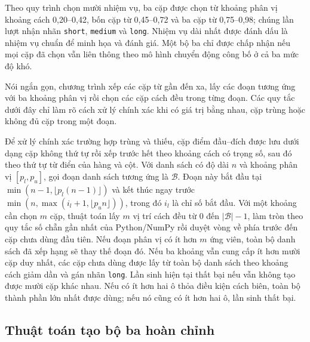 \documentclass[11pt]{article}
\begin{document}
Theo quy trình chọn mười nhiệm vụ, ba cặp được chọn từ khoảng phân vị khoảng cách
0,20--0,42, bốn cặp từ 0,45--0,72 và ba cặp từ 0,75--0,98; chúng lần lượt nhận
nhãn \texttt{short}, \texttt{medium} và \texttt{long}. Nhiệm vụ dài nhất được
đánh dấu là nhiệm vụ chuẩn để minh họa và đánh giá. Một bộ ba chỉ được chấp nhận
nếu mọi cặp đã chọn vẫn liên thông theo mô hình chuyển động công bố ở cả ba mức
độ khó.

Nói ngắn gọn, chương trình xếp các cặp từ gần đến xa, lấy các đoạn tương ứng
với ba khoảng phân vị rồi chọn các cặp cách đều trong từng đoạn. Các quy tắc
dưới đây chỉ làm rõ cách xử lý chính xác khi có giá trị bằng nhau, cặp trùng
hoặc không đủ cặp trong một đoạn.

Để xử lý chính xác trường hợp trùng và thiếu, cặp điểm đầu--đích được lưu dưới dạng
cặp không thứ tự rồi xếp trước hết theo khoảng cách có trọng số, sau đó theo thứ
tự từ điển của hàng và cột. Với danh sách có độ dài $n$ và khoảng phân vị
$[p_l,p_u]$, gọi đoạn danh sách tương ứng là $\mathcal{B}$. Đoạn này bắt đầu tại
$\min(n-1,\lfloor p_l(n-1)\rfloor)$ và kết thúc
ngay trước $\min(n,\max(i_l+1,\lfloor p_u n\rfloor))$, trong đó $i_l$ là chỉ
số bắt đầu. Với một khoảng cần chọn $m$ cặp, thuật toán lấy $m$ vị trí cách đều
từ 0 đến $|\mathcal{B}|-1$, làm tròn theo quy tắc số chẵn gần nhất của
Python/NumPy rồi duyệt vòng về phía trước đến cặp chưa dùng đầu tiên. Nếu đoạn
phân vị có ít hơn $m$ ứng viên, toàn bộ danh sách đã xếp hạng sẽ thay thế đoạn
đó. Nếu ba khoảng vẫn cung cấp ít hơn
mười cặp duy nhất, các cặp chưa dùng được lấy từ toàn bộ danh sách theo khoảng
cách giảm dần và gán nhãn \texttt{long}. Lần sinh hiện tại thất bại nếu vẫn
không tạo được mười cặp khác nhau. Nếu có ít hơn hai ô thỏa điều kiện cách biên,
toàn bộ thành phần lớn nhất được dùng; nếu nó cũng có ít hơn hai ô,
lần sinh thất bại.

\subsection{Thuật toán tạo bộ ba hoàn chỉnh}
\end{document}

